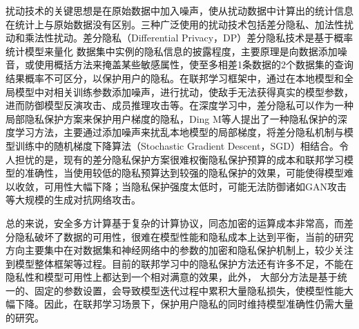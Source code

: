 扰动技术的关键思想是在原始数据中加入噪声，使从扰动数据中计算出的统计信息在统计上与原始数据没有区别。三种广泛使用的扰动技术包括差分隐私、加法性扰动和乘法性扰动。差分隐私（Differential Privacy，DP）差分隐私技术是基于概率统计模型来量化
数据集中实例的隐私信息的披露程度，主要原理是向数据添加噪音，或使用概括方法来掩盖某些敏感属性，使至多相差1条数据的2个数据集的查询结果概率不可区分，以保护用户的隐私。在联邦学习框架中，通过在本地模型和全局模型中对相关训练参数添加噪声，进行扰动，使敌手无法获得真实的模型参数，进而防御模型反演攻击、成员推理攻击等。在深度学习中，差分隐私可以作为一种局部隐私保护方案来保护用户梯度的隐私，Ding M等人提出了一种隐私保护的深度学习方法，主要通过添加噪声来扰乱本地模型的局部梯度，将差分隐私机制与模型训练中的随机梯度下降算法（Stochastic Gradient Descent，SGD）相结合。令人担忧的是，现有的差分隐私保护方案很难权衡隐私保护预算的成本和联邦学习模型的准确性，当使用较低的隐私预算达到较强的隐私保护的效果，可能使得模型难以收敛，可用性大幅下降；当隐私保护强度太低时，可能无法防御诸如GAN攻击等大规模的生成对抗网络攻击。

总的来说，安全多方计算基于复杂的计算协议，同态加密的运算成本非常高，而差分隐私破坏了数据的可用性，很难在模型性能和隐私成本上达到平衡，当前的研究方向主要集中在对数据集和神经网络中的参数的加密和隐私保护机制上，较少关注到模型整体框架等过程。目前的联邦学习中的隐私保护方法还有许多不足，不能在隐私性和模型可用性上都达到一个相对满意的效果，此外， 大部分方法是基于统一的、固定的参数设置，会导致模型迭代过程中累积大量隐私损失，使模型性能大幅下降。因此，在联邦学习场景下，保护用户隐私的同时维持模型准确性仍需大量的研究。

